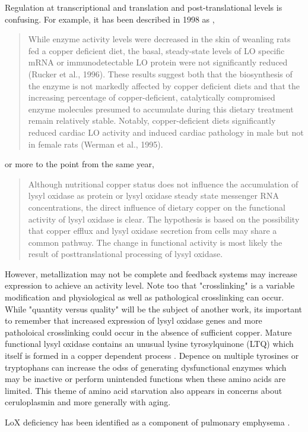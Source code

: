 {Regulation at transcriptional and translation and post-translational
levels is confusing. For example, it has been described in
1998 as \cite{SmithMungo_Kagan_Lysyl_oxidase_Properties_regulation_1998},
\begin{quote}
While enzyme activity levels were decreased in the skin of weanling rats
fed a copper deficient diet, the basal, steady-state levels of LO specific
mRNA or immunodetectable LO protein were not significantly reduced (Rucker
et al., 1996). These results suggest both that the biosynthesis of the enzyme
is not markedly affected by copper deficient diets and that the increasing
percentage of copper-deficient, catalytically compromised enzyme molecules
presumed to accumulate during this dietary treatment remain relatively stable.
Notably, copper-deficient diets significantly reduced cardiac LO activity
and induced cardiac pathology in male but not in female rats (Werman et
al., 1995). 
\end{quote}
or more to the point from the same year,
\cite{Rucker_Kosonen_Clegg_Copper_lysyl_oxidase_1998}
\begin{quote}
Although nutritional copper status does not influence the accumulation of
lysyl oxidase as protein or lysyl oxidase steady state messenger RNA concentrations,
the direct influence of dietary copper on the functional activity of lysyl
oxidase is clear. The hypothesis is based on the possibility that copper
efflux and lysyl oxidase secretion from cells may share a common pathway.
The change in functional activity is most likely the result of posttranslational
processing of lysyl oxidase.
\end{quote}

However, metallization may not be complete
and feedback systems may increase expression to achieve
an activity level. Note too that "crosslinking" is
a variable modification and physiological as well as
pathological crosslinking can occur. 
While "quantity versus quality" will be the subject of
another work, its important to remember that increased
expression of lysyl oxidase genes and more patholoical
crosslinking could occur in the absence of sufficient copper.
Mature functional lysyl oxidase contains an unusual 
 lysine tyrosylquinone (LTQ) which itself is formed in 
a copper dependent process \cite{PMC2749888}.
Depence on multiple tyrosines or tryptophans   can
increase the odss of generating dysfunctional
enzymes which may be inactive or perform unintended functions 
when these amino acids are limited. This theme of amino
acid starvation also appears in concerns about ceruloplasmin
and more generally with aging. 

LoX deficiency has been identified as a component of
pulmonary emphysema 
\cite{Besiktepe_Kayalar_Ersen_copper_dependent_lysyl_2017}
\cite{Janssen_Brouwer_vonderThusen_Copper_most_2018}.


} %

